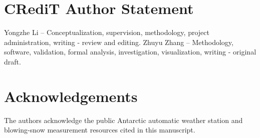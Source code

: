 \section*{CRediT Author Statement}
Yongzhe Li -- Conceptualization, supervision, methodology, project
administration, writing - review and editing. Zhuyu Zhang -- Methodology,
software, validation, formal analysis, investigation, visualization, writing -
original draft.

\section*{Acknowledgements}
The authors acknowledge the public Antarctic automatic weather station and
blowing-snow measurement resources cited in this manuscript.
